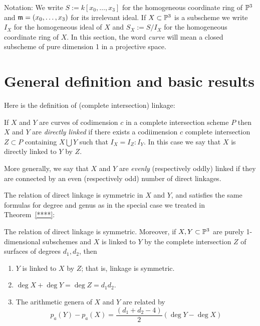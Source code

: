 Notation:  We write $S := k[x_0,\dots,x_3]$ for the homogeneous coordinate ring of ${\mathbb P}^3$ and $\mathfrak m = (x_0,\dots,x_3)$ for its
irrelevant ideal. If $X\subset {\mathbb P}^3$ is a subscheme we write $I_X$ for the homogeneous ideal of $X$ and $S_X:=S/I_X$ for the homogeneous coordinate ring of $X$.  In this section, the word \emph{curve} will mean a closed subscheme of pure dimension 1 in a projective space.

\section{General definition and basic results}\label{linkage definition}

Here is the definition of (complete intersection) linkage:
\begin{definition}
If $X$ and $Y$ are curves  of codimension $c$ in a complete intersection scheme $P$ then $X$ and $Y$ are \emph{directly linked} if there exists a codiimension $c$ complete intersection $Z \subset P$ containing $X\bigcup Y$ such that $I_{X} = I_{Z}:I_{Y}$. In this case we say that $X$ is directly linked to $Y$ by $Z$. 

More generally, we say that $X$ and $Y$ are \emph{evenly} (respectively oddly) linked if they are
connected by an even (respectively odd) number of direct linkages.\end{definition}

The relation of direct linkage is symmetric in $X$ and $Y$, and satisfies the same formulas for degree and genus as in the special case we treated in Theorem~\ref{****}:

\begin{theorem}\label{justification of general linkage} The relation of direct linkage is symmetric. Moreover, if $X,Y\subset {\mathbb P}^{3}$ are purely 1-dimensional subschemes and $X$ is linked to $Y$ by the complete intersection $Z$ of surfaces of degrees $d_{1}, d_{2}$, then
\begin{enumerate}
\item $Y$ is linked to $X$ by $Z$; that is, linkage is symmetric.
 \item $\deg X+\deg Y = \deg Z = d_{1}d_{2}$.
 \item  The arithmetic genera of $X$ and $Y$ are related by
$$
p_{a}(Y) - p_{a}(X) =\frac{(d_{1}+d_{2}-4)}{2} (\deg Y - \deg X)
$$
\end{enumerate}
 \end{theorem}
 
